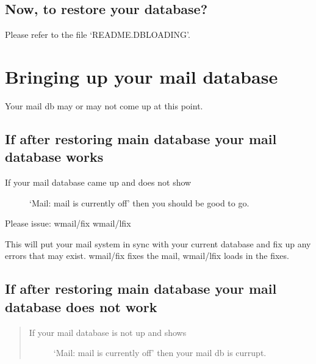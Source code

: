 \documentclass[letterpaper,10pt,english]{sphinxmanual}
\begin{document}
\subsection{Now, to restore your database?}
\label{\detokenize{27-dbcorrupt:now-to-restore-your-database}}
\sphinxAtStartPar
Please refer to the file ‘README.DBLOADING’.


\section{Bringing up your mail database}
\label{\detokenize{27-dbcorrupt:bringing-up-your-mail-database}}
\sphinxAtStartPar
Your mail db may or may not come up at this point.


\subsection{If after restoring main database your mail database works}
\label{\detokenize{27-dbcorrupt:if-after-restoring-main-database-your-mail-database-works}}\begin{description}
\item[{If your mail database came up and does not show}] \leavevmode
\sphinxAtStartPar
‘Mail: mail is currently off’ then you should be good to go.

\end{description}

\sphinxAtStartPar
Please issue:
wmail/fix
wmail/lfix

\sphinxAtStartPar
This will put your mail system in sync with your current database and
fix up any errors that may exist.  wmail/fix fixes the mail, wmail/lfix
loads in the fixes.


\subsection{If after restoring main database your mail database does not work}
\label{\detokenize{27-dbcorrupt:if-after-restoring-main-database-your-mail-database-does-not-work}}\begin{quote}
\begin{description}
\item[{If your mail database is not up and shows}] \leavevmode
\sphinxAtStartPar
‘Mail: mail is currently off’ then your mail db is currupt.

\end{description}
\end{quote}
\end{document}
